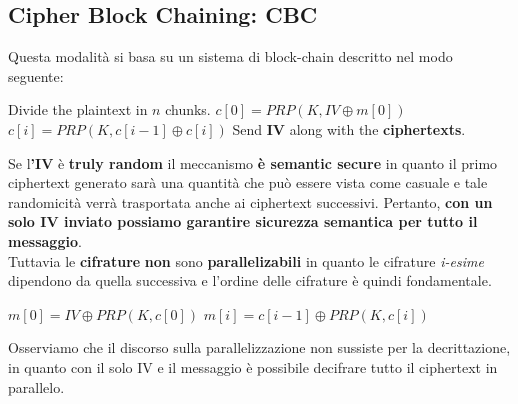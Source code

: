\subsection{Cipher Block Chaining: CBC}
Questa modalità si basa su un sistema di block-chain descritto nel modo seguente:
\begin{definition}\label{def:cbcenc}
\begin{algorithmic}[1]
\State Divide the plaintext in $n$ chunks.
\State $c[0] = PRP(K,IV\oplus m[0])$
    \State $c[i] = PRP(K, c[i-1]\oplus c[i])$
\EndFor
\State Send \textbf{IV} along with the \textbf{ciphertexts}.
\end{algorithmic}
\end{definition}
Se l\textbf{'IV} è \textbf{truly random} il meccanismo \textbf{è semantic secure} in quanto il primo ciphertext generato sarà una quantità che può essere vista come casuale e tale randomicità verrà trasportata anche ai ciphertext successivi. Pertanto, \textbf{con un solo IV inviato possiamo garantire sicurezza semantica per tutto il messaggio}.\\
Tuttavia le \textbf{cifrature} \textbf{non} sono \textbf{parallelizabili} in quanto le cifrature \textit{i-esime} dipendono da quella successiva e l'ordine delle cifrature è quindi fondamentale. 
\begin{definition}\label{def:cbcdec}
\begin{algorithmic}[1]
\State $m[0]=IV\oplus PRP(K,c[0])$
\State $m[i] = c[i-1]\oplus PRP(K, c[i])$
\EndFor
\end{algorithmic}
\end{definition}
Osserviamo che il discorso sulla parallelizzazione non sussiste per la decrittazione, in quanto con il solo IV e il messaggio è possibile decifrare tutto il ciphertext in parallelo.
